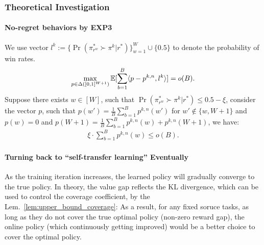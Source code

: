 %
%
%
%
%
%
%
%

%
%
%
%
%




%
%

%

%
%
%
%

%
%

%
%
%
%
%
%


%

%
%

%
%
%

%
%
%
%
%
%
%
%
%

%
%
%
%
%
%
%
%
%
%
%
    
%
%
%
%
%
%

%
%
%

%
%
%
%

%
%
%
%
%


%
%

%

%
%
%

%

%
%
%

\iffalse
\subsubsection{Theoretical Investigation}
\paragraph{No-regret behaviors by EXP3}
We use vector $l^k := \{\Pr(\pi^*_{r^w} \succ \pi^k|r^*)\}_{w=1}^W \cup \{0.5\}$ to denote the probability of win rates.
\begin{align*}
    \max_{p\in\Delta([0,1]^{W+1})} \mathbb{E}[\sum_{b=1}^B \langle p - p^{k,n}, l^k \rangle] = o(B).
\end{align*}
Suppose there exists $w\in[W]$, such that $\Pr(\pi^*_{r^w} \succ \pi^k|r^*) \leq 0.5 - \xi$, consider the vector $p$, such that $p(w') = \frac{1}{B} \sum_{b=1}^B p^{k,n}(w')$ for $w'\not\in\{w,W+1\}$ and $p(w) = 0$ and $p(W+1) = \frac{1}{B} \sum_{b=1}^B p^{k,n}(w) + p^{k,n}(W+1)$, we have:
\begin{align*}
    \xi \cdot \sum_{b=1}^B p^{k,n}(w)  \leq o(B).
\end{align*}
%
%
%
%
\paragraph{Turning back to ``self-transfer learning'' Eventually}
As the training iteration increases, the learned policy will gradually converge to the true policy. In theory, the value gap reflects the KL divergence, which can be used to control the coverage coefficient, by the Lem.~\ref{lem:upper_bound_coverage}:
As a result, for any fixed soruce tasks, as long as they do not cover the true optimal policy (non-zero reward gap), the online policy (which continuously getting improved) would be a better choice to cover the optimal policy.

